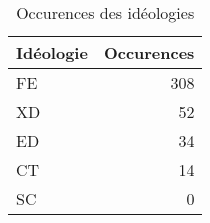 \begin{table}

\caption{Occurences des idéologies}
\centering
\begin{tabular}[t]{l|r}
\hline
Idéologie & Occurences\\
\hline
FE & 308\\
\hline
XD & 52\\
\hline
ED & 34\\
\hline
CT & 14\\
\hline
SC & 0\\
\hline
\end{tabular}
\end{table}
